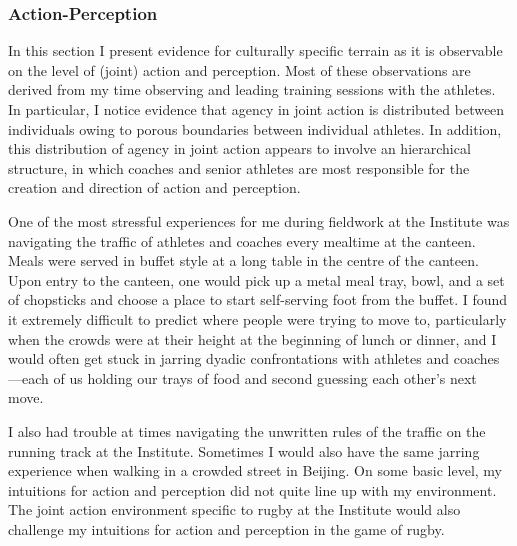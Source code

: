 \begin{CJK}{UTF8}{gbsn}
\subsubsection{Action-Perception}
In this section I present evidence for culturally specific terrain as it is observable on the level of (joint) action and perception.  Most of these observations are derived from my time observing and leading training sessions with the athletes.  In particular, I notice evidence that agency in joint action is distributed between individuals owing to porous boundaries between individual athletes. In addition, this distribution of agency in joint action appears to involve an hierarchical structure, in which coaches and senior athletes are most
responsible for the creation and direction of action and perception.

One of the most stressful experiences for me during fieldwork at the Institute was navigating the traffic of athletes and coaches every mealtime at the canteen.  Meals were served in buffet style at a long table in the centre of the canteen. Upon entry to the canteen, one would pick up a metal meal tray, bowl, and a set of chopsticks and choose a place to start self-serving foot from the buffet.  I found it extremely difficult to predict where people were trying to move to, particularly when the crowds were at their height at the beginning of lunch or dinner, and I would often get stuck in jarring dyadic confrontations with athletes and coaches---each of us holding our trays of food and second guessing each other's next move.

I also had trouble at times navigating the unwritten rules of the traffic on the running track at the Institute.  Sometimes I would also have the same jarring experience when walking in a crowded street in Beijing. On some basic level, my intuitions for action and perception did not quite line up with my environment.  The joint action environment specific to rugby at the Institute would also challenge my intuitions for action and perception in the game of rugby.


\end{CJK}
